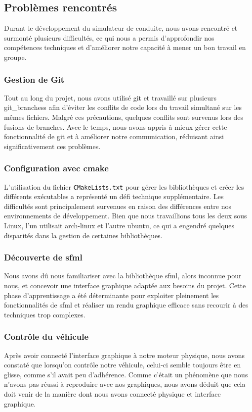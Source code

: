 \subsection{Problèmes rencontrés}\label{subsec:problemes-rencontres}
Durant le développement du simulateur de conduite, nous avons rencontré et surmonté plusieurs difficultés, ce qui nous a permis d'approfondir nos compétences techniques et d'améliorer notre capacité à mener un bon travail en groupe.

\subsubsection{Gestion de Git}\label{subsubsec:git}
Tout au long du projet, nous avons utilisé \gls{git} et travaillé sur plusieurs \glspl{git_branches} afin d'éviter les conflits de code lors du travail simultané sur les mêmes fichiers.
Malgré ces précautions, quelques conflits sont survenus lors des fusions de branches.
Avec le temps, nous avons appris à mieux gérer cette fonctionnalité de \gls{git} et à améliorer notre communication, réduisant ainsi significativement ces problèmes.

\subsubsection{Configuration avec \gls{cmake}}\label{subsubsec:cmake}
L'utilisation du fichier \texttt{CMakeLists.txt} pour gérer les bibliothèques et créer les différents exécutables a représenté un défi technique supplémentaire.
Les difficultés sont principalement survenues en raison des différences entre nos environnements de développement.
Bien que nous travaillions tous les deux sous Linux, l'un utilisait \gls{arch-linux} et l'autre \gls{ubuntu}, ce qui a engendré quelques disparités dans la gestion de certaines bibliothèques.

\subsubsection{Découverte de \gls{sfml}}\label{subsubsec:sfml}
Nous avons dû nous familiariser avec la bibliothèque \gls{sfml}, alors inconnue pour nous, et concevoir une interface graphique adaptée aux besoins du projet.
Cette phase d'apprentissage a été déterminante pour exploiter pleinement les fonctionnalités de \gls{sfml} et réaliser un rendu graphique efficace sans recourir à des techniques trop complexes.

\subsubsection{Contrôle du véhicule}\label{subsubsec:ctrlVehicule}
Après avoir connecté l'interface graphique à notre moteur physique, nous avons constaté que lorsqu'on contrôle notre véhicule, celui-ci semble toujours être en glisse, comme s'il avait peu d'adhérence.
Comme c'était un phénomène que nous n'avons pas réussi à reproduire avec nos graphiques, nous avons déduit que cela doit venir de la manière dont nous avons connecté physique et interface graphique.

